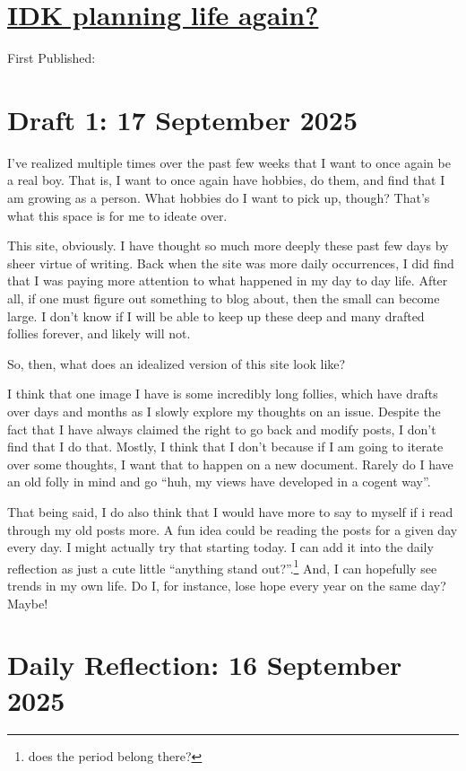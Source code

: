 \documentclass[12pt]{article}
\newcommand{\say}[1]{``#1''}
\renewcommand{\,}{\textsuperscript{,}}
\begin{document}
  
\doublespacing  
\section{\href{planning.html}{IDK planning life again?}}  
First Published: 
\section{Draft 1: 17 September 2025}
I've realized multiple times over the past few weeks that I want to once again be a real boy.
That is, I want to once again have hobbies, do them, and find that I am growing as a person.
What hobbies do I want to pick up, though?
That's what this space is for me to ideate over.

This site, obviously.
I have thought so much more deeply these past few days by sheer virtue of writing.
Back when the site was more daily occurrences, I did find that I was paying more attention to what happened in my day to day life.
After all, if one must figure out something to blog about, then the small can become large.
I don't know if I will be able to keep up these deep and many drafted follies forever, and likely will not.

So, then, what does an idealized version of this site look like?

I think that one image I have is some incredibly long follies, which have drafts over days and months as I slowly explore my thoughts on an issue.
Despite the fact that I have always claimed the right to go back and modify posts, I don't find that I do that.
Mostly, I think that I don't because if I am going to iterate over some thoughts, I want that to happen on a new document.
Rarely do I have an old folly in mind and go \say{huh, my views have developed in a cogent way}.

That being said, I do also think that I would have more to say to myself if i read through my old posts more.
A fun idea could be reading the posts for a given day every day.
I might actually try that starting today.
I can add it into the daily reflection as just a cute little \say{anything stand out?}.\footnote{does the period belong there?}
And, I can hopefully see trends in my own life.
Do I, for instance, lose hope every year on the same day?
Maybe!



\section{Daily Reflection: 16 September 2025}
\end{document}
